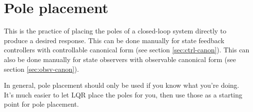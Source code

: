 \section{Pole placement}

This is the practice of placing the poles of a closed-loop \gls{system} directly
to produce a desired response. This can be done manually for state feedback
controllers with controllable canonical form (see section \ref{sec:ctrl-canon}).
This can also be done manually for \gls{state} \glspl{observer} with observable
canonical form (see section \ref{sec:obsv-canon}).

In general, pole placement should only be used if you know what you're doing.
It's much easier to let LQR place the poles for you, then use those as a
starting point for pole placement.
